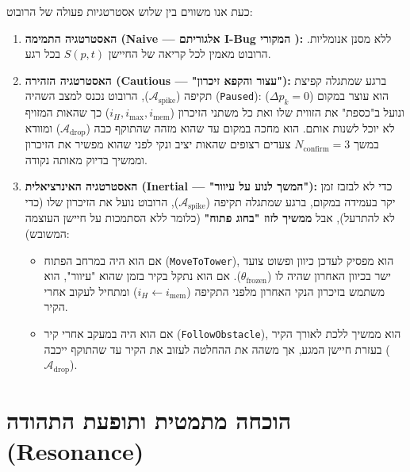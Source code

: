 \documentclass[11pt, a4paper]{article}
\begin{document}
כעת אנו משווים בין שלוש אסטרטגיות פעולה של הרובוט:
\begin{enumerate}
    \item \textbf{האסטרטגיה התמימה (\foreignlanguage{english}{Naive} — אלגוריתם \foreignlanguage{english}{I-Bug} המקורי \cite{taylor2014intensity}):} ללא מסנן אנומליות. הרובוט מאמין לכל קריאה של החיישן $S(p, t)$ בכל רגע.
    \item \textbf{האסטרטגיה הזהירה (\foreignlanguage{english}{Cautious} — "עצור והקפא זיכרון"):} ברגע שמתגלה קפיצת תקיפה ($\mathcal{A}_{\text{spike}}$), הרובוט נכנס למצב השהיה (\foreignlanguage{english}{\texttt{Paused}}): הוא עוצר במקום ($\Delta p_k = 0$) ונועל ב"כספת" את הזווית שלו ואת כל משתני הזיכרון ($i_H, i_{\text{max}}, i_{\text{mem}}$) כך שהאות המזויף לא יוכל לשנות אותם. הוא מחכה במקום עד שהוא מזהה שהתוקף כבה ($\mathcal{A}_{\text{drop}}$) ומוודא במשך $N_{\text{confirm}} = 3$ צעדים רצופים שהאות יציב ונקי לפני שהוא מפשיר את הזיכרון וממשיך בדיוק מאותה נקודה.
    \item \textbf{האסטרטגיה האינרציאלית (\foreignlanguage{english}{Inertial} — "המשך לנוע על עיוור"):} כדי לא לבזבז זמן יקר בעמידה במקום, ברגע שמתגלה תקיפה ($\mathcal{A}_{\text{spike}}$), הרובוט נועל את הזיכרון שלו (כדי לא להתרעל), אבל \textbf{ממשיך לזוז "בחוג פתוח"} (כלומר ללא הסתמכות על חיישן העוצמה המשובש):
    \begin{itemize}
        \item אם הוא היה במרחב הפתוח (\foreignlanguage{english}{\texttt{MoveToTower}}), הוא מפסיק לעדכן כיוון ופשוט צועד ישר בכיוון האחרון שהיה לו ($\theta_{\text{frozen}}$). אם הוא נתקל בקיר בזמן שהוא "עיוור", הוא משתמש בזיכרון הנקי האחרון מלפני התקיפה ($i_H \leftarrow i_{\text{mem}}$) ומתחיל לעקוב אחרי הקיר.
        \item אם הוא היה במעקב אחרי קיר (\foreignlanguage{english}{\texttt{FollowObstacle}}), הוא ממשיך ללכת לאורך הקיר בעזרת חיישן המגע, אך משהה את ההחלטה לעזוב את הקיר עד שהתוקף ייכבה ($\mathcal{A}_{\text{drop}}$).
    \end{itemize}
\end{enumerate}

\section{הוכחה מתמטית ותופעת התהודה (\foreignlanguage{english}{Resonance})}
\end{document}
